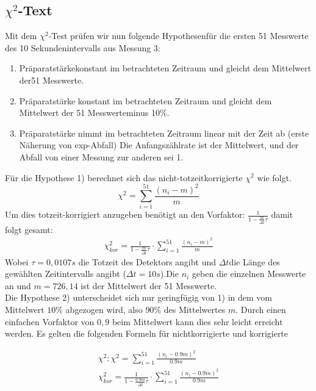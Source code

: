 \documentclass{article}
\begin{document}
	\subsection{$\chi^2$-Text}
	Mit dem $\chi^2$-Test prüfen wir nun folgende Hypothesenfür die ersten 51 Messwerte des 10 Sekundenintervalls aus Messung 3:\\
	\begin{enumerate}
	\item Präparatstärkekonstant im betrachteten Zeitraum und gleicht dem Mittelwert der51 Messwerte.
	\item Präparatstärke konstant im betrachteten Zeitraum und gleicht dem Mittelwert der 51 Messwerteminus 10\%.
	\item Präparatstärke nimmt im betrachteten Zeitraum linear mit der Zeit ab (erste Näherung von exp-Abfall) Die Anfangszählrate ist der Mittelwert, und der Abfall von einer Messung zur anderen sei 1.\\
	\end{enumerate}
	
	\noindent
	Für die Hypothese 1) berechnet sich das nicht-totzeitkorrigierte $\chi^2$ wie folgt.\[\chi^2=\sum_{i=1}^{51}\frac{\left(n_i-m\right)^2}{m}\]Um dies totzeit-korrigiert anzugeben benötigt an den Vorfaktor: $\frac{1}{1-\frac{m}{\Delta t}\tau}$ damit folgt gesamt:
	\begin{gather}
	\chi_{kor}^2=\frac{1}{1-\frac{m}{\Delta t}\tau}\cdot\sum_{i=1}^{51}\frac{\left(n_i-m\right)^2}{m}
	\end{gather}
	Wobei $\tau=0,0107s$ die Totzeit des Detektors angibt und $\Delta t$die Länge des gewählten Zeitintervalls angibt ($\Delta t=10s$).Die $n_i$ geben die einzelnen Messwerte an und $m=726,14$ ist der Mittelwert der 51 Messwerte.\\
	Die Hypothese 2) unterscheidet sich nur geringfügig von 1) in dem vom Mittelwert $10\%$ abgezogen wird, also $90\%$ des Mittelwertes $m$. Durch einen einfachen Vorfaktor von $0,9$ beim Mittelwert kann dies sehr leicht erreicht werden. Es gelten die folgenden Formeln für nichtkorrigierte und korrigierte
	
	\begin{gather}
	\chi^2:\chi^2=\sum_{i=1}^{51}\frac{\left(n_i-0.9m\right)^2}{0.9m}\\
	\chi_{kor}^2=\frac{1}{1-\frac{0.9m}{\Delta t}\tau}\cdot\sum_{i=1}^{51}\frac{\left(n_i-0.9m\right)^2}{0.9m}
	\end{gather}
	
\end{document}
